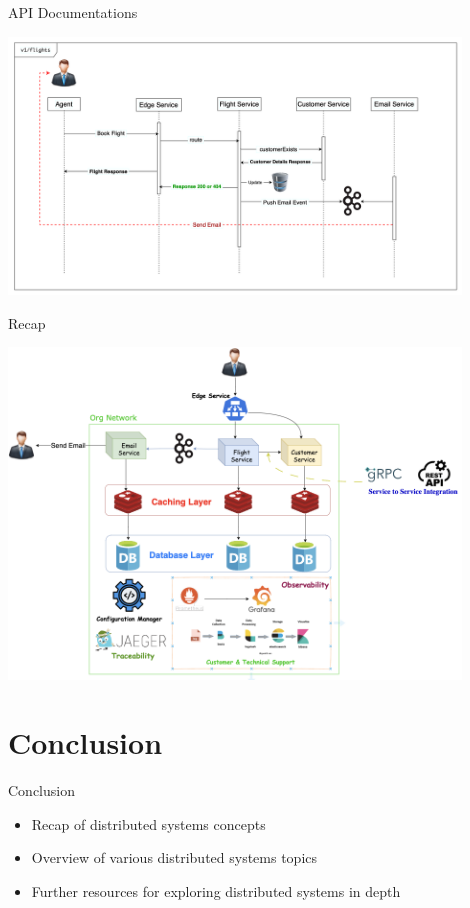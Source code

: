 \documentclass{beamer}
\begin{document}
\begin{frame}{API Documentations}
  \begin{center}
    \includegraphics[width=0.9\textwidth]{img/sd.png} 
  \end{center} 
\end{frame}

\begin{frame}{Recap}
  \begin{center}
    \includegraphics[width=0.9\textwidth]{img/flight-system-latest.png} 
  \end{center} 
\end{frame}

\section{Conclusion}
\begin{frame}{Conclusion}
  \begin{itemize}
    \item Recap of distributed systems concepts
    \item Overview of various distributed systems topics
    \item Further resources for exploring distributed systems in depth
  \end{itemize}
\end{frame}
\end{document}
